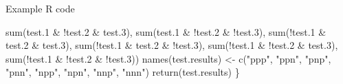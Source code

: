 \documentclass[
  ignorenonframetext,
]{beamer}
\newenvironment{Shaded}{\begin{snugshade}}{\end{snugshade}}
\newcommand{\FloatTok}[1]{\textcolor[rgb]{0.00,0.00,0.81}{#1}}
\newcommand{\FunctionTok}[1]{\textcolor[rgb]{0.00,0.00,0.00}{#1}}
\newcommand{\NormalTok}[1]{#1}
\newcommand{\OtherTok}[1]{\textcolor[rgb]{0.56,0.35,0.01}{#1}}
\newcommand{\SpecialCharTok}[1]{\textcolor[rgb]{0.00,0.00,0.00}{#1}}
\newcommand{\StringTok}[1]{\textcolor[rgb]{0.31,0.60,0.02}{#1}}
\begin{document}
\begin{frame}[fragile]{Example R code}
\begin{Shaded}
\begin{Highlighting}[]
    \FunctionTok{sum}\NormalTok{(test}\FloatTok{.1} \SpecialCharTok{\&} \SpecialCharTok{!}\NormalTok{test}\FloatTok{.2} \SpecialCharTok{\&}\NormalTok{ test}\FloatTok{.3}\NormalTok{),}
    \FunctionTok{sum}\NormalTok{(test}\FloatTok{.1} \SpecialCharTok{\&} \SpecialCharTok{!}\NormalTok{test}\FloatTok{.2} \SpecialCharTok{\&} \SpecialCharTok{!}\NormalTok{test}\FloatTok{.3}\NormalTok{),}
    \FunctionTok{sum}\NormalTok{(}\SpecialCharTok{!}\NormalTok{test}\FloatTok{.1} \SpecialCharTok{\&}\NormalTok{ test}\FloatTok{.2} \SpecialCharTok{\&}\NormalTok{ test}\FloatTok{.3}\NormalTok{),}
    \FunctionTok{sum}\NormalTok{(}\SpecialCharTok{!}\NormalTok{test}\FloatTok{.1} \SpecialCharTok{\&}\NormalTok{ test}\FloatTok{.2} \SpecialCharTok{\&} \SpecialCharTok{!}\NormalTok{test}\FloatTok{.3}\NormalTok{),}
    \FunctionTok{sum}\NormalTok{(}\SpecialCharTok{!}\NormalTok{test}\FloatTok{.1} \SpecialCharTok{\&} \SpecialCharTok{!}\NormalTok{test}\FloatTok{.2} \SpecialCharTok{\&}\NormalTok{ test}\FloatTok{.3}\NormalTok{),}
    \FunctionTok{sum}\NormalTok{(}\SpecialCharTok{!}\NormalTok{test}\FloatTok{.1} \SpecialCharTok{\&} \SpecialCharTok{!}\NormalTok{test}\FloatTok{.2} \SpecialCharTok{\&} \SpecialCharTok{!}\NormalTok{test}\FloatTok{.3}\NormalTok{))}
  \FunctionTok{names}\NormalTok{(test.results) }\OtherTok{\textless{}{-}} \FunctionTok{c}\NormalTok{(}\StringTok{"ppp"}\NormalTok{, }\StringTok{"ppn"}\NormalTok{, }\StringTok{"pnp"}\NormalTok{, }\StringTok{"pnn"}\NormalTok{, }\StringTok{"npp"}\NormalTok{, }\StringTok{"npn"}\NormalTok{, }\StringTok{"nnp"}\NormalTok{, }\StringTok{"nnn"}\NormalTok{)}
  \FunctionTok{return}\NormalTok{(test.results)}
\NormalTok{\}}
\end{Highlighting}
\end{Shaded}
\end{frame}
\end{document}
